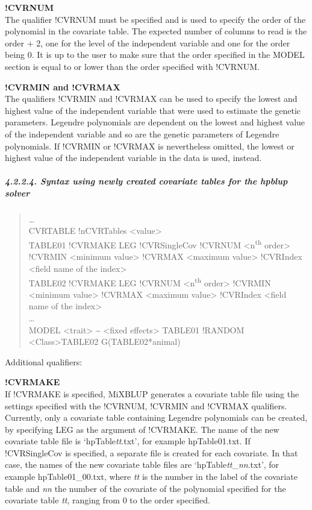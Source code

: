 \textbf{!CVRNUM}\\
The qualifier !CVRNUM must be specified and is used to specify the order
of the polynomial in the covariate table. The expected number of columns
to read is the order + 2, one for the level of the independent variable
and one for the order being 0. It is up to the user to make sure that
the order specified in the MODEL section is equal to or lower than the
order specified with !CVRNUM.

\textbf{!CVRMIN and !CVRMAX}\\

The qualifiers !CVRMIN and !CVRMAX can be used to specify the lowest and
highest value of the independent variable that were used to estimate the
genetic parameters. Legendre polynomials are dependent on the lowest and
highest value of the independent variable and so are the genetic
parameters of Legendre polynomials. If !CVRMIN or !CVRMAX is
nevertheless omitted, the lowest or highest value of the independent
variable in the data is used, instead.

\subparagraph{4.2.2.4. Syntax using newly created covariate tables for
the hpblup solver}\label{Obse13}

\begin{quote}
\ldots{}\\
CVRTABLE !nCVRTables \textless value\textgreater{}\\
TABLE01 !CVRMAKE LEG !CVRSingleCov !CVRNUM
\textless n\textsuperscript{th} order\textgreater{} !CVRMIN
\textless minimum value\textgreater{} !CVRMAX \textless maximum
value\textgreater{} !CVRIndex \textless field name of the
index\textgreater{}\\
TABLE02 !CVRMAKE LEG !CVRNUM \textless n\textsuperscript{th}
order\textgreater{} !CVRMIN \textless minimum value\textgreater{}
!CVRMAX \textless maximum value\textgreater{} !CVRIndex \textless field
name of the index\textgreater{}\\
\ldots{}\\
MODEL \textless trait\textgreater{} \textasciitilde{} \textless fixed
effects\textgreater{} TABLE01 !RANDOM
\textless Class\textgreater*TABLE02 G(TABLE02*animal)
\end{quote}

Additional qualifiers:

\textbf{!CVRMAKE}\\

If !CVRMAKE is specified, MiXBLUP generates a covariate table file using
the settings specified with the !CVRNUM, !CVRMIN and !CVRMAX qualifiers.
Currently, only a covariate table containing Legendre polynomials can be
created, by specifying LEG as the argument of !CVRMAKE. The name of the
new covariate table file is `hpTable\emph{tt}.txt', for example
hpTable01.txt. If !CVRSingleCov is specified, a separate file is created
for each covariate. In that case, the names of the new covariate table
files are `hpTable\emph{tt}\_\emph{nn}.txt', for example
hpTable01\_00.txt, where \emph{tt} is the number in the label of the
covariate table and \emph{nn} the number of the covariate of the
polynomial specified for the covariate table \emph{tt}, ranging from 0
to the order specified.

